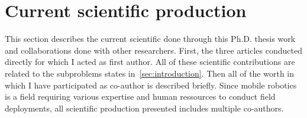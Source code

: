 \section{Current scientific production}
\label{sec:submitted}

This section describes the current scientific done through this Ph.D. thesis work and collaborations done with other researchers. 
First, the three articles conducted directly for which I acted as first author.
All of these scientific contributions are related to the subproblems states in~\autoref{sec:introduction}.
Then all of the worth in which I have participated as co-author is described briefly.
Since mobile robotics is a field requiring various expertise and human ressources to conduct field deployments, all scientific production presented includes multiple co-authors.



